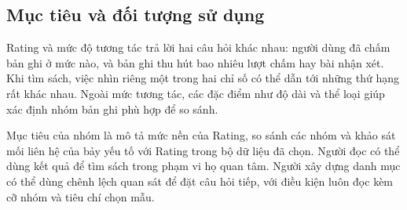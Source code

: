 \documentclass[11pt,a4paper]{article}
\begin{document}
\subsection{Mục tiêu và đối tượng sử dụng}
Rating và mức độ tương tác trả lời hai câu hỏi khác nhau: người dùng đã chấm bản ghi ở mức nào, và bản ghi thu hút bao nhiêu lượt chấm hay bài nhận xét. Khi tìm sách, việc nhìn riêng một trong hai chỉ số có thể dẫn tới những thứ hạng rất khác nhau. Ngoài mức tương tác, các đặc điểm như độ dài và thể loại giúp xác định nhóm bản ghi phù hợp để so sánh.

Mục tiêu của nhóm là mô tả mức nền của Rating, so sánh các nhóm và khảo sát mối liên hệ của bảy yếu tố với Rating trong bộ dữ liệu đã chọn. Người đọc có thể dùng kết quả để tìm sách trong phạm vi họ quan tâm. Người xây dựng danh mục có thể dùng chênh lệch quan sát để đặt câu hỏi tiếp, với điều kiện luôn đọc kèm cỡ nhóm và tiêu chí chọn mẫu.
\end{document}
